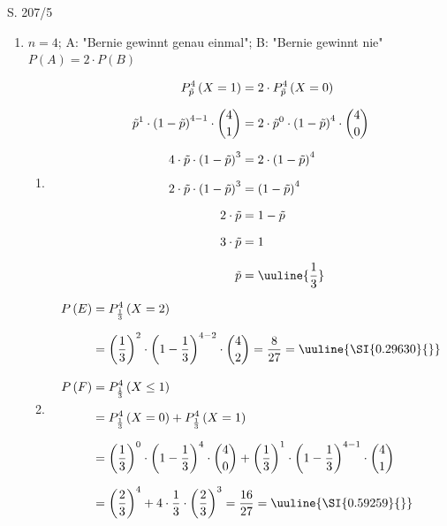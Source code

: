 \begin{Exercise}{S. 207/5}{}
\begin{enumerate}[leftmargin=*]
    \item [5.]{
        $n = 4$; \quad A: "Bernie gewinnt genau einmal"; \quad B: "Bernie gewinnt nie"\\[1.0ex]
        $P(A) = 2 \cdot P(B)$\\[-1.0ex]
        \begin{enumerate}[label=\alph*),leftmargin=*]
            \item[a)] {
                \begin{align*}
                    P_{\tilde{p}}^{4}\left(X = 1\right) &= 2 \cdot P_{\tilde{p}}^{4}\left(X = 0\right)\\[1.5ex]
                    \tilde{p}^{1} \cdot \left(1 - \tilde{p}\right)^{4-1} \cdot \binom{4}{1} &= 2 \cdot \tilde{p}^{0} \cdot \left(1 - \tilde{p}\right)^{4} \cdot \binom{4}{0}\\[1.5ex]
                    4 \cdot \tilde{p} \cdot \left(1 - \tilde{p}\right)^{3} &= 2 \cdot \left(1 - \tilde{p}\right)^{4}\\[1.5ex]
                    2 \cdot \tilde{p} \cdot \left(1 - \tilde{p}\right)^{3} &= \left(1 - \tilde{p}\right)^{4}\\[1.5ex]
                    2 \cdot \tilde{p} &= 1 - \tilde{p}\\[1.5ex]
                    3 \cdot \tilde{p} &= 1\\[1.5ex]
                    \tilde{p} &= \uuline{\dfrac{1}{3}}
                \end{align*}
                }
            \item[b)] {
                \begin{align*}
                    P\left(E\right) &= P_{\frac{1}{3}}^{4}\left(X = 2\right)\\[1.5ex]
                    &= \left(\dfrac{1}{3}\right)^{2} \cdot \left(1 - \dfrac{1}{3}\right)^{4-2} \cdot \binom{4}{2} = \dfrac{8}{27} = \uuline{\SI{0.29630}{}}\\[2.0ex]
                    P\left(F\right) &= P_{\frac{1}{3}}^{4}\left(X \leq 1\right)\\[1.5ex]
                    &= P_{\frac{1}{3}}^{4}\left(X = 0\right) + P_{\frac{1}{3}}^{4}\left(X = 1\right)\\[1.5ex]
                    &= \left(\dfrac{1}{3}\right)^{0} \cdot \left(1 - \dfrac{1}{3}\right)^{4} \cdot \binom{4}{0} + \left(\dfrac{1}{3}\right)^{1} \cdot \left(1 - \dfrac{1}{3}\right)^{4-1} \cdot \binom{4}{1}\\[1.5ex]
                    &= \left(\dfrac{2}{3}\right)^{4} + 4 \cdot \dfrac{1}{3} \cdot \left(\dfrac{2}{3}\right)^{3} = \dfrac{16}{27} = \uuline{\SI{0.59259}{}}
                \end{align*}
                }
        \end{enumerate}
    }
\end{enumerate}
\end{Exercise}
\pagebreak

